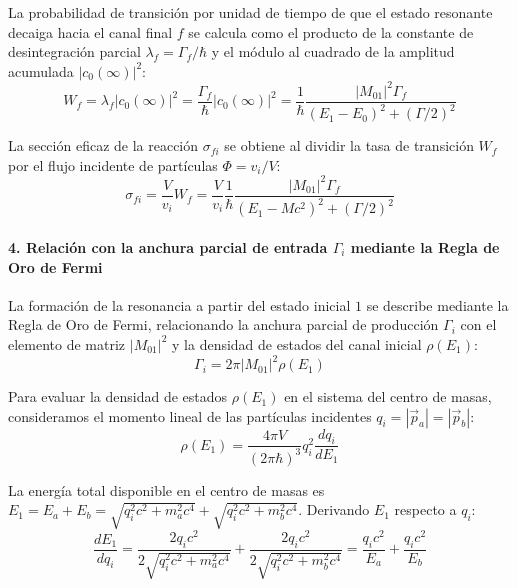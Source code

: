 La probabilidad de transición por unidad de tiempo de que el estado resonante decaiga hacia el canal final $f$ se calcula como el producto de la constante de desintegración parcial $\lambda_f = \Gamma_f / \hbar$ y el módulo al cuadrado de la amplitud acumulada $|c_0(\infty)|^2$:
\begin{equation}
W_f = \lambda_f |c_0(\infty)|^2 = \frac{\Gamma_f}{\hbar} |c_0(\infty)|^2 = \frac{1}{\hbar} \frac{|M_{01}|^2 \Gamma_f}{(E_1 - E_0)^2 + (\Gamma / 2)^2}
\end{equation}

La sección eficaz de la reacción $\sigma_{fi}$ se obtiene al dividir la tasa de transición $W_f$ por el flujo incidente de partículas $\Phi = v_i / V$:
\begin{equation}
\sigma_{fi} = \frac{V}{v_i} W_f = \frac{V}{v_i} \frac{1}{\hbar} \frac{|M_{01}|^2 \Gamma_f}{(E_1 - M c^2)^2 + (\Gamma / 2)^2}
\end{equation}

\paragraph{4. Relación con la anchura parcial de entrada $\Gamma_i$ mediante la Regla de Oro de Fermi}

La formación de la resonancia a partir del estado inicial $1$ se describe mediante la Regla de Oro de Fermi, relacionando la anchura parcial de producción $\Gamma_i$ con el elemento de matriz $|M_{01}|^2$ y la densidad de estados del canal inicial $\rho(E_1)$:
\begin{equation}
\Gamma_i = 2\pi |M_{01}|^2 \rho(E_1)
\end{equation}

Para evaluar la densidad de estados $\rho(E_1)$ en el sistema del centro de masas, consideramos el momento lineal de las partículas incidentes $q_i = |\vec{p}_a| = |\vec{p}_b|$:
\begin{equation}
\rho(E_1) = \frac{4\pi V}{(2\pi\hbar)^3} q_i^2 \frac{dq_i}{dE_1}
\end{equation}

La energía total disponible en el centro de masas es $E_1 = E_a + E_b = \sqrt{q_i^2 c^2 + m_a^2 c^4} + \sqrt{q_i^2 c^2 + m_b^2 c^4}$. Derivando $E_1$ respecto a $q_i$:
\begin{equation}
\frac{dE_1}{dq_i} = \frac{2 q_i c^2}{2\sqrt{q_i^2 c^2 + m_a^2 c^4}} + \frac{2 q_i c^2}{2\sqrt{q_i^2 c^2 + m_b^2 c^4}} = \frac{q_i c^2}{E_a} + \frac{q_i c^2}{E_b}
\end{equation}

